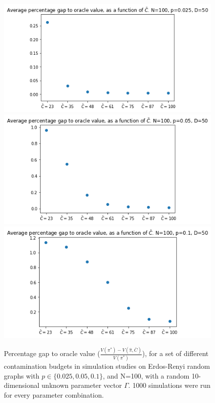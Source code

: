 \documentclass[11pt,a4paper]{article}
\begin{document}
\begin{figure}[!h]
\begin{center}
\includegraphics[scale=0.45]{Network_Sim/n100_gridC_p0025_c10}
\includegraphics[scale=0.45]{Network_Sim/n_100_gridC_p005_c10}
\includegraphics[scale=0.45]{Network_Sim/n_100_gridC_p01_c10}
\caption{Percentage gap to oracle value ($\frac{ V(\pi^*) - V(\hat \pi, \bar{C})}{V(\pi^*) }$), for a set of different contamination budgets in simulation studies on Erdos-Renyi random graphs with $p \in \{0.025,0.05,0.1\}$, and N=100, with a random 10-dimensional unknown parameter vector $\Gamma$. 1000 simulations were run for every parameter combination.}
\end{center}
\end{figure}
\end{document}
